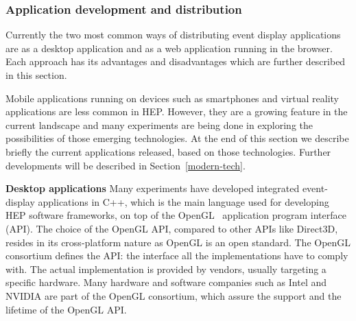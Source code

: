\documentclass[12pt,a4paper]{article}
\begin{document}


\hypertarget{application-development}{%
\subsubsection{Application development and distribution}\label{application-development}}

Currently the two most common ways of distributing event display applications are as a desktop application and as a web
application running in the browser. Each approach has its advantages and disadvantages which are further described in this section.

Mobile applications running on devices such as smartphones and virtual reality applications are less common in HEP. However,
they are a growing feature in the current landscape and many experiments are being done in exploring the possibilities of those emerging technologies. At the end of this section we describe briefly the current applications released, based on those technologies. Further developments will be described in
Section~\ref{modern-tech}.

{\bf Desktop applications} Many experiments have developed integrated event-display applications in C++, which is the main language used for developing
HEP software frameworks, on top of the OpenGL~\cite{OpenGL1992} application program interface (API).
The choice of the OpenGL API, compared to other APIs like Direct3D, resides in its cross-platform nature as
OpenGL is an open standard. The OpenGL consortium defines the API: the interface all the implementations have to
comply with. The actual implementation is provided by vendors, usually targeting a specific hardware. Many hardware and
software companies such as Intel and NVIDIA are part of the OpenGL consortium, which assure
the support and the lifetime of the OpenGL API.
\end{document}
